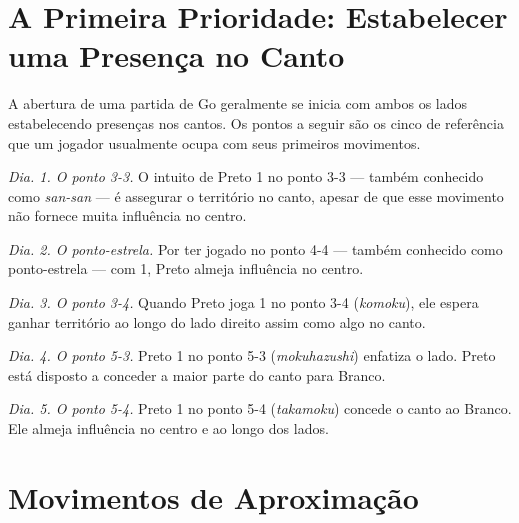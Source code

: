 \section{A Primeira Prioridade: Estabelecer uma Presença no Canto}

A abertura de uma partida de Go geralmente se inicia com ambos os lados estabelecendo presenças nos cantos. Os pontos a seguir são os cinco de referência que um jogador usualmente ocupa com seus primeiros movimentos.

\emph{Dia. 1. O ponto 3-3.} O intuito de Preto 1 no ponto 3-3 --- também conhecido como \emph{san-san} --- é assegurar o território no canto, apesar de que esse movimento não fornece muita influência no centro.

\emph{Dia. 2. O ponto-estrela.} Por ter jogado no ponto 4-4 --- também conhecido como ponto-estrela --- com 1, Preto almeja influência no centro.

\emph{Dia. 3. O ponto 3-4.} Quando Preto joga 1 no ponto 3-4 (\emph{komoku}), ele espera ganhar território ao longo do lado direito assim como algo no canto.

\emph{Dia. 4. O ponto 5-3.} Preto 1 no ponto 5-3 (\emph{mokuhazushi}) enfatiza o lado. Preto está disposto a conceder a maior parte do canto para Branco.

\emph{Dia. 5. O ponto 5-4.} Preto 1 no ponto 5-4 (\emph{takamoku}) concede o canto ao Branco. Ele almeja influência no centro e ao longo dos lados.

\section{Movimentos de Aproximação}

